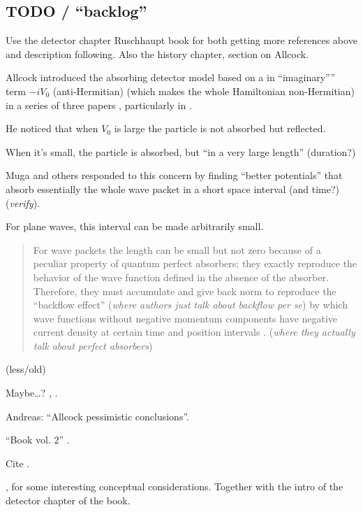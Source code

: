 \subsection*{TODO / ``backlog''}

Use the detector chapter Ruschhaupt book for both getting more references above and description following.
Also the history chapter, section on Allcock.

Allcock introduced the absorbing detector model based on a in ``imaginary'''' term $-iV_0$
(anti-Hermitian) (which makes the whole Hamiltonian non-Hermitian) in a series of three papers
\parencite{Allcock-1, Allcock-2, Allcock-3},
particularly in \cite[sec. II-IV]{Allcock-2}.

He noticed that when $V_0$ is large the particle is not absorbed but reflected.

When it's small, the particle is absorbed, but ``in a very large length'' (duration?)

Muga and others responded to this concern by finding ``better potentials'' that absorb essentially the
whole wave packet in a short space interval (and time?)
\parencite{Muga_TOAQM, Muga_CompositeAbsPot, ComplexAbsPot} (\emph{verify}).

For plane waves, this interval can be made arbitrarily small.

\begin{quotation}
  For wave packets the length can be small but not zero because of a
  peculiar property of quantum perfect absorbers; they exactly reproduce
  the behavior of the wave function defined in the absence of the absorber.
  Therefore, they must accumulate and give back norm to reproduce the
  ``backflow effect'' \parencite{Bracken_bf, Bracken_ProbTransport}
  (\emph{where authors just talk about backflow per se})
  by which wave functions without negative momentum components
  have negative current density at certain time and position intervals
  \parencite{Leavens_backflow}. (\emph{where they actually talk about perfect absorbers})
\end{quotation}

\cite{ComplexAbsPot}

\cite{Werner_ArrivalTime} (less/old)

Maybe\dots? \cite{ProbCurrent}, \cite{Ruschhaupt_QMoT}.

Andreas: ``Allcock pessimistic conclusions''.

``Book vol. 2'' \cite{TQM2:Detector}.

Cite \cite{Muga_ArrTimeOpNormal, Damborenea, Sudarshan_Zeno, Echanobe, Savvidou-1, Savvidou-2}.

\cite{Damborenea_atomic}, for some interesting conceptual considerations. Together with the
intro of the detector chapter of the book.